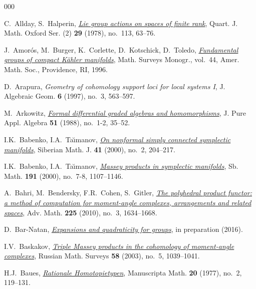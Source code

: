 \documentclass{article}
\numberwithin{equation}{section}
\theoremstyle{definition}
\begin{document}
\begin{thebibliography}{000}


 C.~Allday, S.~Halperin,
\href{https://dx.doi.org/10.1093/qmath/29.1.63}
{\em Lie group actions on spaces of finite rank}, 
Quart. J. Math. Oxford Ser. (2) \textbf{29} (1978), no.~113, 63--76. 

  J.~Amor{\'o}s, M.~Burger, K.~Corlette, D.~Kotschick, D.~Toledo, 
\href{https://dx.doi.org/10.1090/surv/044}%
{\em Fundamental groups of compact {K}\"{a}hler 
manifolds}, Math. Surveys Monogr., vol.~44, Amer. Math. Soc., 
Providence, RI, 1996. 

 D.~Arapura, 
{\em Geometry of cohomology support loci for local systems  {\rm I}}, 
J. Algebraic Geom. \textbf{6} (1997), no.~3, 563--597.  

 M.~Arkowitz,
\href{https://dx.doi.org/10.1016/0022-4049(88)90076-X}%
{\em Formal differential graded algebras and homomorphisms}, 
J. Pure Appl. Algebra \textbf{51} (1988), no.~1-2, 35--52.
 
 I.K.~Babenko, I.A.~Ta\u{\i}manov, 
\href{https://dx.doi.org/10.1007/BF02674589}%
{\em On nonformal simply connected symplectic manifolds}, 
Siberian Math. J. \textbf{41} (2000), no.~2, 204--217.

 I.K.~Babenko, I.A.~Ta\u{\i}manov, 
\href{https://dx.doi.org/10.1070/SM2000v191n08ABEH000497}%
{\em Massey products in symplectic manifolds}, 
Sb. Math. \textbf{191} (2000), no.~7-8, 1107--1146.

A.~Bahri, M.~Bendersky, F.R.~Cohen, S.~Gitler, 
\href{https://dx.doi.org/10.1016/j.aim.2010.03.026}%
{\em The polyhedral product functor: a method of 
computation for moment-angle complexes, 
arrangements and related spaces}, Adv. Math. 
\textbf{225} (2010), no.~3, 1634--1668.

 D.~Bar-Natan, 
\href{http://drorbn.net/AcademicPensieve/Projects/ExQu/}
{\emph{Expansions and quadraticity for groups}}, in preparation (2016).

  I.V.~Baskakov, 
\href{https://dx.doi.org/10.1070/RM2003v058n05ABEH000670}%
{\em Triple Massey products in the cohomology of moment-angle 
complexes}, Russian Math. Surveys \textbf{58} (2003), no.~5, 1039--1041. 

 H.J.~Baues, 
\href{https://dx.doi.org/10.1007/BF01170720}%
{\em Rationale Homotopietypen}, 
Manuscripta Math. \textbf{20} (1977), no.~2, 119--131. 


\end{thebibliography}
\end{document}
